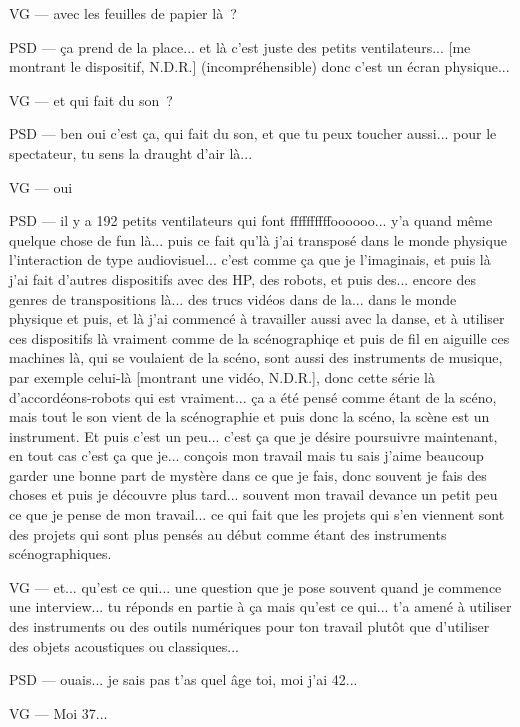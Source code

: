 VG — avec les feuilles de papier là ?

PSD — ça prend de la place... et là c'est juste des petits ventilateurs... [me montrant le dispositif,  N.D.R.] (incompréhensible) donc c'est un écran physique...

VG — et qui fait du son ?

PSD — ben oui c'est ça, qui fait du son, et que tu peux toucher aussi... pour le spectateur, tu sens la draught d'air là...  

VG — oui

PSD — il y a 192 petits ventilateurs qui font ffffffffffoooooo... y'a quand même quelque chose de fun là... puis ce fait qu'là j'ai transposé dans le monde physique l'interaction de type audiovisuel... c'est comme ça que je l'imaginais, et puis là j'ai fait d'autres dispositifs avec des HP, des robots, et puis des... encore des genres de transpositions là... des trucs vidéos dans de la... dans le monde physique et puis, et là j'ai commencé à travailler aussi avec la danse, et à utiliser ces dispositifs là vraiment comme de la scénographiqe et puis de fil en aiguille ces machines là, qui se voulaient de la scéno, sont aussi des instruments de musique, par exemple celui-là [montrant une vidéo,  N.D.R.], donc cette série là d'accordéons-robots qui est vraiment... ça a été pensé comme étant de la scéno, mais tout le son vient de la scénographie et puis donc la scéno, la scène est un instrument. Et puis c'est un peu... c'est ça que je désire poursuivre maintenant, en tout cas c'est ça que je... conçois mon travail mais tu sais j'aime beaucoup garder une bonne part de mystère dans ce que je fais, donc souvent je fais des choses et puis je découvre plus tard... souvent mon travail devance un petit peu ce que je pense de mon travail... ce qui fait que les projets qui s'en viennent sont des projets qui sont plus pensés au début comme étant des instruments scénographiques.

VG — et... qu'est ce qui... une question que je pose souvent quand je commence une interview... tu réponds en partie à ça mais qu'est ce qui... t'a amené à utiliser des instruments ou des outils numériques pour ton travail plutôt que d'utiliser des objets acoustiques ou classiques...

PSD — ouais... je sais pas t'as quel âge toi, moi j'ai 42...

VG — Moi 37...

